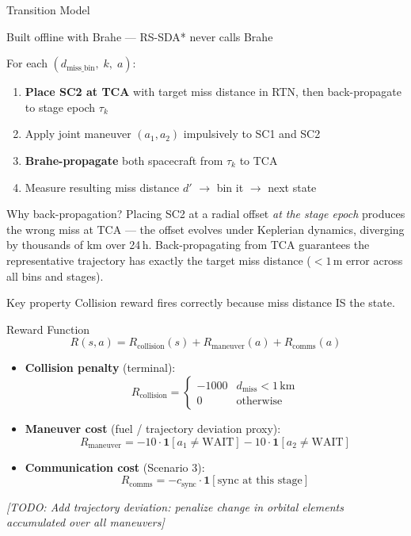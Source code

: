 \documentclass[aspectratio=169]{beamer}
\newcommand{\TODO}[1]{\textcolor{todo}{\textit{[TODO: #1]}}}
\begin{document}
\begin{frame}{Transition Model}
  \begin{block}{Built offline with Brahe --- RS-SDA* never calls Brahe}
  \end{block}
  \vspace{0.5em}
  For each $(d_\text{miss\_bin},\; k,\; a)$:
  \begin{enumerate}
    \item \textbf{Place SC2 at TCA} with target miss distance in RTN,
          then back-propagate to stage epoch $\tau_k$
    \item Apply joint maneuver $(a_1, a_2)$ impulsively to SC1 and SC2
    \item \textbf{Brahe-propagate} both spacecraft from $\tau_k$ to TCA
    \item Measure resulting miss distance $d'$ $\rightarrow$ bin it $\rightarrow$ next state
  \end{enumerate}
  \vspace{0.3em}
  \begin{block}{Why back-propagation?}
    Placing SC2 at a radial offset \emph{at the stage epoch} produces the wrong miss
    at TCA --- the offset evolves under Keplerian dynamics, diverging by thousands of km
    over 24\,h. Back-propagating from TCA guarantees the representative trajectory
    has exactly the target miss distance ($< 1$\,m error across all bins and stages).
  \end{block}
  \vspace{0.2em}
  \begin{alertblock}{Key property}
    Collision reward fires correctly because miss distance IS the state.
  \end{alertblock}
\end{frame}

\begin{frame}{Reward Function}
  \[
    R(s, a) = R_\text{collision}(s) + R_\text{maneuver}(a) + R_\text{comms}(a)
  \]
  \vspace{0.5em}
  \begin{itemize}
    \item \textbf{Collision penalty} (terminal):
      \[
        R_\text{collision} = \begin{cases} -1000 & d_\text{miss} < 1\,\text{km} \\ 0 & \text{otherwise} \end{cases}
      \]
    \item \textbf{Maneuver cost} (fuel / trajectory deviation proxy):
      \[
        R_\text{maneuver} = -10 \cdot \mathbf{1}[a_1 \neq \text{WAIT}]
                            -10 \cdot \mathbf{1}[a_2 \neq \text{WAIT}]
      \]
    \item \textbf{Communication cost} (Scenario 3):
      \[
        R_\text{comms} = -c_\text{sync} \cdot \mathbf{1}[\text{sync at this stage}]
      \]
  \end{itemize}
  \vspace{0.3em}
  \TODO{Add trajectory deviation: penalize change in orbital elements accumulated over all maneuvers}
\end{frame}
\end{document}
